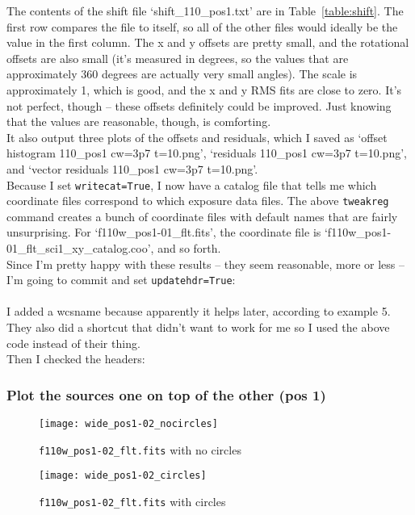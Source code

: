 \documentclass[11pt,obeyspaces]{article} %
\begin{document}
The contents of the shift file `shift\_110\_pos1.txt' are in Table~\ref{table:shift}. The first row compares the file to itself, so all of the other files would ideally be the value in the first column. The x and y offsets are pretty small, and the rotational offsets are also small (it's measured in degrees, so the values that are approximately 360 degrees are actually very small angles). The scale is approximately 1, which is good, and the x and y RMS fits are close to zero. It's not perfect, though -- these offsets definitely could be improved. Just knowing that the values are reasonable, though, is comforting. \\

It also output three plots of the offsets and residuals, which I saved as `offset histogram 110\_pos1 cw=3p7 t=10.png', `residuals 110\_pos1 cw=3p7 t=10.png', and `vector residuals 110\_pos1 cw=3p7 t=10.png'. \\

Because I set {\tt writecat=True}, I now have a catalog file that tells me which coordinate files correspond to which exposure data files. The above {\tt tweakreg} command creates a bunch of coordinate files with default names that are fairly unsurprising. For `f110w\_pos1-01\_flt.fits', the coordinate file is `f110w\_pos1-01\_flt\_sci1\_xy\_catalog.coo', and so forth. \\

Since I'm pretty happy with these results -- they seem reasonable, more or less -- I'm going to commit and set {\tt updatehdr=True}: \\

 \\
I added a wcsname because apparently it helps later, according to example 5. They also did a shortcut that didn't want to work for me so I used the above code instead of their thing. \\

Then I checked the headers:\\

\subsubsection{Plot the sources one on top of the other (pos 1)}
\label{plotsources}

\begin{figure}
\centering
\begin{minipage}[b]{.45\linewidth}
\texttt{[image: wide\_pos1-02\_nocircles]}
\caption{{\tt f110w\_pos1-02\_flt.fits} with no circles}
\label{fig:circles}
\end{minipage}
\quad
\begin{minipage}[b]{.45\linewidth}
\texttt{[image: wide\_pos1-02\_circles]}
\caption{{\tt f110w\_pos1-02\_flt.fits}  with circles}
\label{fig:nocircles}
\end{minipage}
\end{figure}
\end{document}

